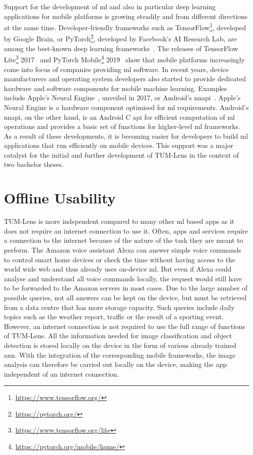 \documentclass[
			   fontsize=11pt,
               paper=a4,
               bibliography=totoc,
               idxtotoc,
               headsepline,
               footsepline,
               footinclude=false,
               BCOR=12mm,
               DIV=13,
               openany,   %
               ]
               {scrbook}
\begin{document}
Support for the development of \gls{ml} and also in particular deep learning applications for mobile platforms is growing steadily and from different directions at the same time. Developer-friendly frameworks such as TensorFlow\footnote{\url{https://www.tensorflow.org/}}, developed by Google Brain, or PyTorch\footnote{\url{https://pytorch.org/}}, developed by Facebook's AI Research Lab, are among the best-known deep learning frameworks~\cite{dl_ranking_2018}. The releases of TensorFlow Lite\footnote{\url{https://www.tensorflow.org/lite}} 2017~\cite{tflite_release_verge_2017} and PyTorch Mobile\footnote{\url{https://pytorch.org/mobile/home/}} 2019~\cite{pytorch_release_2019} show that mobile platforms increasingly come into focus of companies providing \acrlong{ml} software. In recent years, device manufacturers and operating system developers also started to provide dedicated hardware and software components for mobile machine learning. Examples include Apple's Neural Engine~\cite{neural_engine_verge_2017}, unveiled in 2017, or Android's \gls{nnapi}~\cite{nnapi_devguide_2021}. Apple's Neural Engine is a hardware component optimised for \acrlong{ml} requirements. Android's \gls{nnapi}, on the other hand, is an Android C \gls{api} for efficient computation of \gls{ml} operations and provides a basic set of functions for higher-level \gls{ml} frameworks. As a result of these developments, it is becoming easier for developers to build \gls{ml} applications that run efficiently on mobile devices. This support was a major catalyst for the initial and further development of TUM-Lens in the context of two bachelor theses.

\section{Offline Usability} \label{sec:offline_usability}

TUM-Lens is more independent compared to many other \acrlong{ml} based apps as it does not require an internet connection to use it. Often, apps and services require a connection to the internet because of the nature of the task they are meant to perform. The Amazon voice assistant Alexa can answer simple voice commands to control smart home devices or check the time without having access to the world wide web and thus already uses on-device \acrlong{ml}. But even if Alexa could analyse and understand all voice commands locally, the request would still have to be forwarded to the Amazon servers in most cases. Due to the large number of possible queries, not all answers can be kept on the device, but must be retrieved from a data centre that has more storage capacity. Such queries include daily topics such as the weather report, traffic or the result of a sporting event. However, an internet connection is not required to use the full range of functions of TUM-Lens. All the information needed for image classification and object detection is stored locally on the device in the form of various already trained \gls{ann}. With the integration of the corresponding mobile frameworks, the image analysis can therefore be carried out locally on the device, making the app independent of an internet connection.
\end{document}
